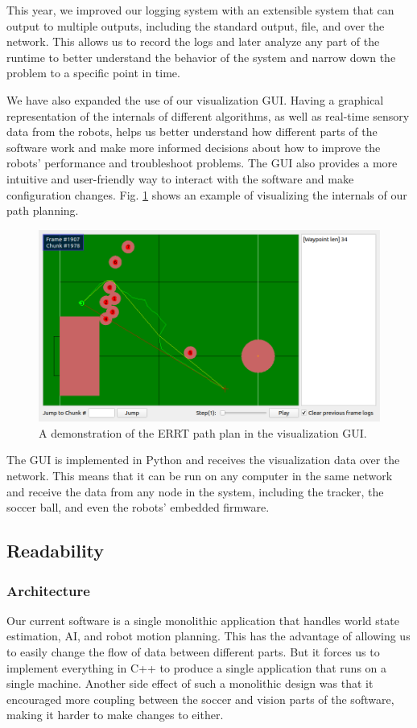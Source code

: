 \documentclass[runningheads]{llncs}
\begin{document}
This year, we improved our logging system with an extensible system that can output to multiple outputs, including the standard output, file, and over the network. This allows us to record the logs and later analyze any part of the runtime to better understand the behavior of the system and narrow down the problem to a specific point in time.

We have also expanded the use of our visualization GUI. Having a graphical representation of the internals of different algorithms, as well as real-time sensory data from the robots, helps us better understand how different parts of the software work and make more informed decisions about how to improve the robots' performance and troubleshoot problems. The GUI also provides a more intuitive and user-friendly way to interact with the software and make configuration changes. Fig. \ref{fig_visualizer} shows an example of visualizing the internals of our path planning.

\begin{figure}
    \includegraphics[width=\textwidth]{images/visual1.png}
    \caption{A demonstration of the ERRT path plan in the visualization GUI.}
    \label{fig_visualizer}
\end{figure}

The GUI is implemented in Python and receives the visualization data over the network. This means that it can be run on any computer in the same network and receive the data from any node in the system, including the tracker, the soccer ball, and even the robots' embedded firmware.


\subsection{Readability}

\subsubsection{Architecture}
Our current software is a single monolithic application that handles world state estimation, AI, and robot motion planning. This has the advantage of allowing us to easily change the flow of data between different parts. But it forces us to implement everything in C++ to produce a single application that runs on a single machine. Another side effect of such a monolithic design was that it encouraged more coupling between the soccer and vision parts of the software, making it harder to make changes to either.
\end{document}
